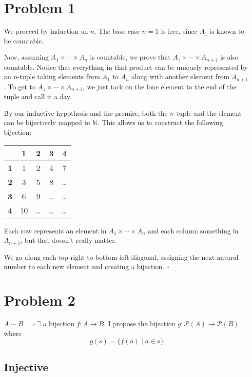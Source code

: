 \documentclass[12pt]{article}
\newcommand{\N}{\mathbb{N}}
\begin{document}
\section{Problem 1}

We proceed by induction on $n$.
The base case $n=1$ is free, since $A_1$ is known to be countable.

Now, assuming $A_1 \times \cdots \times A_n$ is countable,
we prove that $A_1 \times \cdots \times A_{n+1}$ is also countable.
Notice that everything in that product can be uniquely represented
by an $n$-tuple taking elements from $A_1$ to $A_n$ along with
another element from $A_{n+1}$.
To get to $A_1 \times \cdots \times A_{n+1}$, we just
tack on the lone element to the end of the tuple and call it a day.

By our inductive hypothesis and the premise,
both the $n$-tuple and the element can be bijectively mapped to $\N$.
This allows us to construct the following bijection:
\begin{center}
  \begin{tabular}{c|cccc}
               & \textbf{1} & \textbf{2} & \textbf{3} & \textbf{4} \\ \hline
    \textbf{1} & 1          & 2          & 4          & 7          \\
    \textbf{2} & 3          & 5          & 8          & \ldots     \\
    \textbf{3} & 6          & 9          & \ldots     & \ldots     \\
    \textbf{4} & 10         & \ldots     & \ldots     & \ldots     \\
  \end{tabular}
\end{center}
Each row represents an element in $A_1 \times \cdots \times A_n$
and each column something in $A_{n+1}$, but that doesn't really matter.

We go along each top-right to bottom-left diagonal, assigning the next
natural number to each new element and creating a bijection. $\square$

\pagebreak

\section{Problem 2}

$A \sim B \implies \exists$ a bijection $f: A \to B$.
I propose the bijection $g: \mathcal{P}(A) \to \mathcal{P}(B)$ where
\[g(s)=\{f(a) \mid a \in s\}\]

\subsection{Injective}
\end{document}
